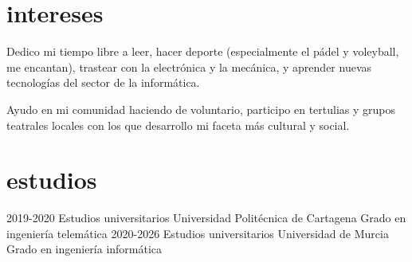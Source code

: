 \documentclass[]{twentysecondcv}
\begin{document}


\skills{}

\skillstext{}

\makeprofile

\section{intereses}

  Dedico mi tiempo libre a leer, hacer deporte (especialmente el pádel y voleyball, me encantan), trastear con la electrónica y la mecánica, y aprender nuevas tecnologías del sector de la informática. 
  
  Ayudo en mi comunidad haciendo de voluntario, participo en tertulias y grupos teatrales locales con los que desarrollo mi faceta más cultural y social.

\section{estudios}
\begin{twenty}
  \twentyitem
    {2019-2020}
    {Estudios universitarios}
    {Universidad Politécnica de Cartagena}
    {Grado en ingeniería telemática}
  \twentyitem
    {2020-2026}
    {Estudios universitarios}
    {Universidad de Murcia}
    {Grado en ingeniería informática}
    
\end{twenty}
\end{document}
